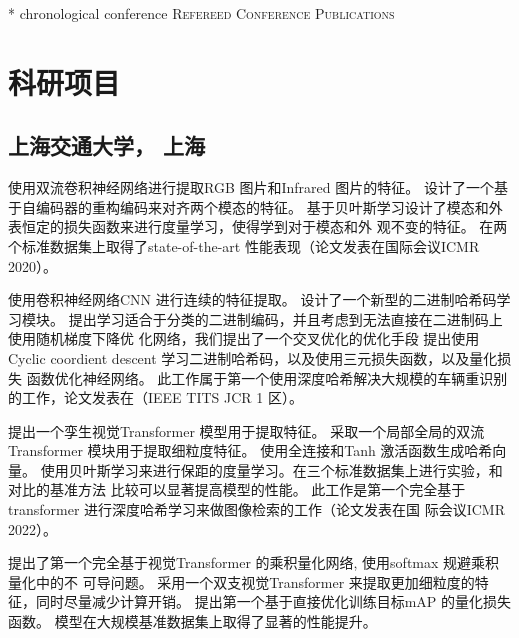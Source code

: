 \documentclass[11pt,a4paper,sans]{moderncv} %
\begin{document}
\nocite{conference}{*}
{chronological}
{conference}
{\large \textsc{Refereed Conference Publications}}



\section{科研项目}
\subsection{上海交通大学， 上海}
{
  使用双流卷积神经网络进行提取RGB 图片和Infrared 图片的特征。
  设计了一个基于自编码器的重构编码来对齐两个模态的特征。
  基于贝叶斯学习设计了模态和外表恒定的损失函数来进行度量学习，使得学到对于模态和外
  观不变的特征。
  在两个标准数据集上取得了state-of-the-art 性能表现（论文发表在国际会议ICMR 2020）。
}

{使用卷积神经网络CNN 进行连续的特征提取。
设计了一个新型的二进制哈希码学习模块。
提出学习适合于分类的二进制编码，并且考虑到无法直接在二进制码上使用随机梯度下降优
化网络，我们提出了一个交叉优化的优化手段
提出使用Cyclic coordient descent 学习二进制哈希码，以及使用三元损失函数，以及量化损失
函数优化神经网络。
此工作属于第一个使用深度哈希解决大规模的车辆重识别的工作，论文发表在（IEEE TITS JCR
1 区）。
}


{提出一个孪生视觉Transformer 模型用于提取特征。
采取一个局部全局的双流Transformer 模块用于提取细粒度特征。
使用全连接和Tanh 激活函数生成哈希向量。
使用贝叶斯学习来进行保距的度量学习。在三个标准数据集上进行实验，和对比的基准方法
比较可以显著提高模型的性能。
此工作是第一个完全基于transformer 进行深度哈希学习来做图像检索的工作（论文发表在国
际会议ICMR 2022）。
}

{
  提出了第一个完全基于视觉Transformer 的乘积量化网络, 使用softmax 规避乘积量化中的不
可导问题。
采用一个双支视觉Transformer 来提取更加细粒度的特征，同时尽量减少计算开销。
提出第一个基于直接优化训练目标mAP 的量化损失函数。
模型在大规模基准数据集上取得了显著的性能提升。
}
\end{document}
